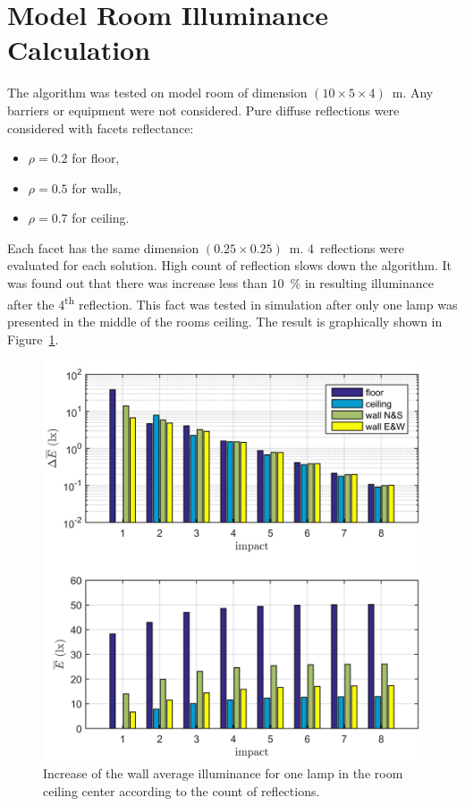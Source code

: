 \section{Model Room Illuminance Calculation}
The algorithm was tested on model room of dimension $\left(10 \times 5 \times 4\right)$~m. Any barriers or equipment were not considered. Pure diffuse reflections were considered with facets reflectance:
\begin{itemize}
	\item $\rho = 0.2$ for floor,
	\item $\rho = 0.5$ for walls,
	\item $\rho = 0.7$ for ceiling.
\end{itemize}
Each facet has the same dimension $\left(0.25 \times 0.25\right)$~m. $4$~reflections were evaluated for each solution. High count of reflection slows down the algorithm. It was found out that there was increase less than $10$~\% in resulting illuminance after the 4\textsuperscript{th} reflection. This fact was tested in simulation after only one lamp was presented in the middle of the rooms ceiling. The result is graphically shown in Figure~\ref{fig:reflDif}.

\begin{figure}[htb]
  \centering
  \includegraphics[width=\columnwidth]{reflDif}
  \caption{Increase of the wall average illuminance for one lamp in the room ceiling center according to the count of reflections.}
  \label{fig:reflDif}
\end{figure}

